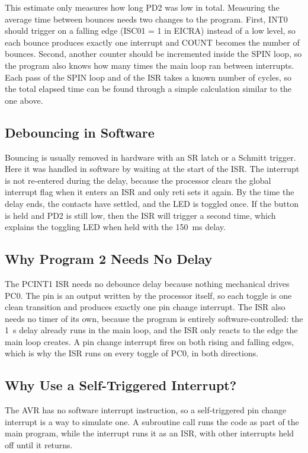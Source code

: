 \documentclass[11pt]{article}
\begin{document}
This estimate only measures how long PD2 was low in total. Measuring the average time between bounces needs two changes to the program. First, INT0 should trigger on a falling edge (ISC01 = 1 in EICRA) instead of a low level, so each bounce produces exactly one interrupt and COUNT becomes the number of bounces. Second, another counter should be incremented inside the SPIN loop, so the program also knows how many times the main loop ran between interrupts. Each pass of the SPIN loop and of the ISR takes a known number of cycles, so the total elapsed time can be found through a simple calculation similar to the one above.

\subsection{Debouncing in Software}
Bouncing is usually removed in hardware with an SR latch or a Schmitt trigger. Here it was handled in software by waiting at the start of the ISR. The interrupt is not re-entered during the delay, because the processor clears the global interrupt flag when it enters an ISR and only reti sets it again. By the time the delay ends, the contacts have settled, and the LED is toggled once. If the button is held and PD2 is still low, then the ISR will trigger a second time, which explains the toggling LED when held with the 150~ms delay.

\subsection{Why Program 2 Needs No Delay}
The PCINT1 ISR needs no debounce delay because nothing mechanical drives PC0. The pin is an output written by the processor itself, so each toggle is one clean transition and produces exactly one pin change interrupt. The ISR also needs no timer of its own, because the program is entirely software-controlled: the 1~s delay already runs in the main loop, and the ISR only reacts to the edge the main loop creates. A pin change interrupt fires on both rising and falling edges, which is why the ISR runs on every toggle of PC0, in both directions.

\subsection{Why Use a Self-Triggered Interrupt?}

The AVR has no software interrupt instruction, so a self-triggered pin change interrupt is a way to simulate one. A subroutine call runs the code as part of the main program, while the interrupt runs it as an ISR, with other interrupts held off until it returns.
\end{document}
